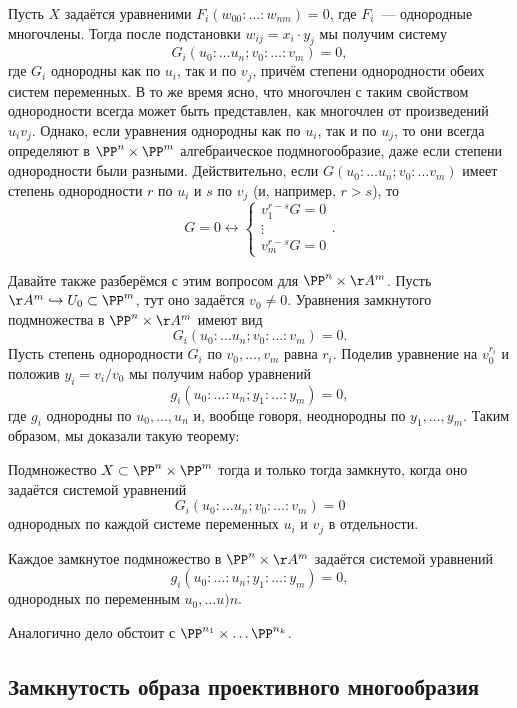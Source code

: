 	Пусть $X$ задаётся уравненими $F_{i}(w_{0 0} : \ldots : w_{n m}) = 0$, где $F_i$~--- однородные многочлены. Тогда после подстановки $w_{i j} = x_i \cdot y_j$ мы получим систему 
 	\[
 		G_i(u_0 : \ldots u_n; v_0 : \ldots : v_m) = 0,
 	\]
 	где $G_i$ однородны как по $u_i$, так и по $v_j$, причём степени однородности обеих систем переменных. В то же время ясно, что многочлен с таким свойством однородности всегда может быть представлен, как многочлен от произведений $u_i v_j$. Однако, если уравнения однородны как по $u_i$, так и по $u_j$, то они всегда определяют в $\PP^n \times \PP^m$ алгебраическое подмногообразие, даже если степени однородности были разными. Действительно, если $G(u_0 : \ldots u_n; v_0 : \ldots v_m)$ имеет степень однородности $r$ по $u_i$ и $s$ по $v_j$ (и, например, $r > s$), то 
 	\[
 		G = 0 \leftrightarrow \begin{cases} v_1^{r - s} G = 0 \\ \vdots \\ v_m^{r - s} G = 0  \end{cases}. 
 	\]

 	Давайте также разберёмся с этим вопросом для $\PP^n \times \AA^m$. Пусть $\AA^m \hookrightarrow U_0 \subset \PP^m$, тут оно задаётся $v_0 \neq 0$. Уравнения замкнутого подмножества в $\PP^n \times \AA^m$ имеют вид 
 	\[
 		G_i(u_0 : \ldots u_n; v_0 : \ldots : v_m) = 0.
 	\]
 	Пусть степень однородности $G_i$ по $v_0, \ldots, v_m$ равна $r_i$. Поделив уравнение на $v_0^{r_i}$ и положив $y_i = v_i/v_0$ мы получим набор уравнений 
 	\[
 		g_i(u_0 : \ldots : u_n; y_1 : \ldots : y_m) = 0,
 	\]
 	где $g_i$ однородны по $u_0, \ldots, u_n$ и, вообще говоря, неоднородны по $y_1, \ldots, y_m$. Таким образом, мы доказали такую теорему: 
 	

 	\begin{theorem}\label{closed_in_product} 
 		Подмножество $X \subset \PP^n \times \PP^m$ тогда и только тогда замкнуто, когда оно задаётся системой уравнений 
 		\[
 			G_i(u_0 : \ldots u_n; v_0 : \ldots : v_m) = 0
 		\]
 		однородных по каждой системе переменных $u_i$ и $v_j$ в отдельности. 

 		Каждое замкнутое подмножество в $\PP^n \times \AA^m$ задаётся системой уравнений 
 		\[
 			g_i(u_0 : \ldots : u_n; y_1 : \ldots : y_m) = 0,
 		\]
 		однородных по переменным $u_0, \ldots u)n$.
 	\end{theorem}

 	Аналогично дело обстоит с $\PP^{n_1} \times \ldots \PP^{n_k}$. 

    \subsection{Замкнутость образа проективного многообразия}\hypertarget{bilet_23}{}

